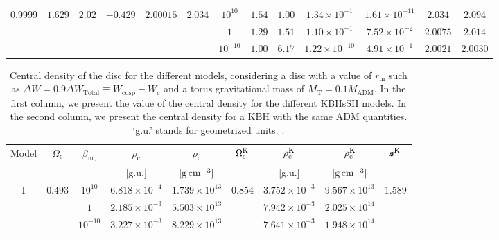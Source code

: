 \documentclass[twocolumn,aps,showpacs,showkeys,prd,superscriptaddress,byrevtex, amsmath]{revtex4-1}
\begin{document}
\begin{table}[t]
\begin{tabular}{c c c c c c  c c c c c c c}
$0.9999$ & $1.629$ & $2.02$ & $-0.429$ & $2.00015$ & $2.034$ & $10^{10}$ & $1.54$ & $1.00$ & $1.34 \times 10^{-1}$ & $1.61 \times 10^{-11}$ & $2.034$ & $2.094$ \\ 

 &  &  &  &  &  & $1$ & $1.29$ & $1.51$ & $1.10 \times 10^{-1}$ & $7.52 \times 10^{-2}$ & $2.0075$ & $2.014$\\ 

 &  &  &  &  &  & $10^{-10}$ & $1.00$ & $6.17$ & $1.22 \times 10^{-10}$ & $4.91 \times 10^{-1}$ & $2.0021$ & $2.0030$ \\ 
\hline\hline
\end{tabular}
\end{table}


\begin{table}[t]
\caption{Central density of the disc for the different models, considering a disc with a value of $r_{\mathrm{in}}$ such as $\Delta W = 0.9 \Delta W_{\mathrm{Total}} \equiv W_{\mathrm{cusp}} - W_{\mathrm{c}}$ and a torus gravitational mass of $M_{\mathrm{T}} = 0.1 M_{\mathrm{ADM}}$. In the first column, we present the value of the central density for the different KBHsSH models. In the second column, we present the central density for a KBH with the same ADM quantities. `g.u.' stands for geometrized units.   . }

\label{density_table}      
\centering          
\begin{tabular}{c c c c c c c c c}
\hline\hline       
 Model & $\Omega_{\mathrm{c}}$ & $\beta_{\mathrm{m_{\mathrm{c}}}}$ & $\rho_{\mathrm{c}}$ & $\rho_{\mathrm{c}}$ & $\Omega^{\rm K}_{\mathrm{c}}$ & $\rho^{\rm K}_{\mathrm{c}}$ & $\rho^{\rm K}_{\mathrm{c}}$ & $\mathfrak{s}^{\rm K}$
 \\
 & & & [g.u.] & $[\mathrm{g} \, \rm{cm}^{-3}]$ & & [g.u.] & $[\mathrm{g} \, \rm{cm}^{-3}]$ & 
  \\ 
\hline           
I & $0.493$ & $10^{10}$ & $6.818 \times 10^{-4}$ & $1.739 \times 10^{13}$ & $0.854$ & $3.752 \times 10^{-3}$ &  $9.567 \times 10^{13}$ & $1.589$ \\ 

 & & $1$ & $2.185 \times 10^{-3}$ & $5.503 \times 10^{13}$ & & $7.942 \times 10^{-3}$ & $2.025 \times 10^{14}$ & \\ 

 & & $10^{-10}$ & $3.227 \times 10^{-3}$ & $8.229 \times 10^{13}$ & & $7.641 \times 10^{-3}$ & $1.948 \times 10^{14}$ & \\ 


\end{tabular}
\end{table}
\end{document}
